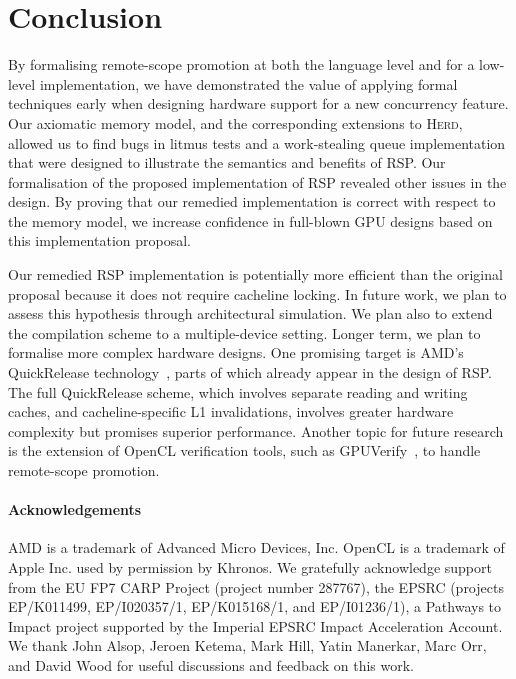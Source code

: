 \documentclass[svgnames,10pt]{sigplanconf}
\theoremstyle{definition}
\newcommand\herd{\textsc{Herd}}
\begin{document}
\section{Conclusion}
\label{sec:conclusion}

By formalising remote-scope promotion at both the language level and
for a low-level implementation, we have demonstrated the value of
applying formal techniques early when designing hardware support for a
new concurrency feature. Our axiomatic memory model, and the
corresponding extensions to \herd{}, allowed us to find bugs in
litmus tests and a work-stealing queue implementation that were
designed to illustrate the semantics and benefits of RSP. Our
formalisation of the proposed implementation of RSP
revealed other issues in the design. By proving that our remedied
implementation is correct with respect to the memory model, we
increase confidence in full-blown GPU designs based on this
implementation proposal.

Our remedied RSP implementation is potentially more efficient than
the original proposal because it does not require cacheline locking.
In future work, we plan to assess this hypothesis through
architectural simulation. We plan also to extend the compilation
scheme to a multiple-device setting. Longer term, we plan to
formalise more complex hardware designs. One promising target is
AMD's QuickRelease technology~\cite{hechtman+14}, parts of which
already appear in the design of RSP. The full QuickRelease scheme,
which involves separate reading and writing caches, and
cacheline-specific L1 invalidations, involves greater hardware
complexity but promises superior performance. Another topic for future
research is the extension of OpenCL verification tools, such as
GPUVerify~\cite{betts+15}, to handle remote-scope promotion.

\paragraph{Acknowledgements} AMD is a trademark of Advanced
\mbox{Micro} Devices, Inc. OpenCL is a trademark of Apple Inc. used by
permission by Khronos. We gratefully acknowledge support from the EU
FP7 CARP Project (project number 287767), the EPSRC (projects
EP/K011499, EP/I020357/1, EP/K015168/1, and EP/I01236/1), a Pathways
to Impact project supported by the Imperial EPSRC Impact Acceleration
Account. We thank John Alsop, Jeroen Ketema, Mark Hill, Yatin
Manerkar, Marc Orr, and David Wood for useful discussions and feedback
on this work.



\end{document}
